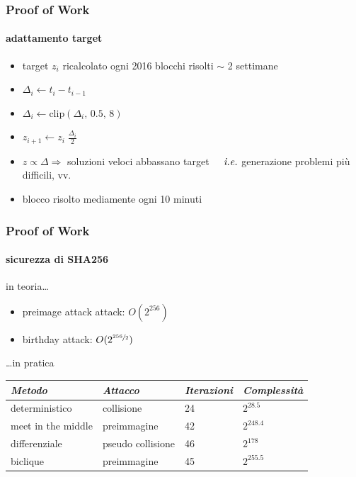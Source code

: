 \begin{frame}
	\frametitle{Proof of Work}
	\framesubtitle{adattamento target}
	
	\begin{itemize}
		\item target $z_i$ ricalcolato ogni 2016 blocchi risolti $\sim$ 2 settimane
		\item $\Delta_i \leftarrow t_{i} - t_{i-1}$
		\item $\Delta_i \leftarrow \mathrm{clip}(\Delta_i,\,0.5,\,8)$
		\item $z_{i+1} \leftarrow z_i\;\frac{\Delta_i}{2}$
		\item $z \propto \Delta \Rightarrow$ {\color{blue}soluzioni veloci} abbassano target 
			\newline $\;\;\;\;\text{\textit{i.e.}}$ generazione {\color{blue}problemi più difficili}, vv.
		\item blocco risolto mediamente ogni 10 minuti
	\end{itemize}
\end{frame}
\begin{frame}
	\frametitle{Proof of Work}
	\framesubtitle{sicurezza di SHA256}
	
	in teoria\ldots
	\begin{itemize}
		\item {\color{blue}preimage attack} attack: $O(2^{256})$
		\item {\color{blue}birthday attack}: $O(2^{\sfrac{256}{2}})$
	\end{itemize}
	
	\ldots in pratica
	
	\begin{table}
	    \begin{tabular}{l|l|l|l}
		    \textit{Metodo}             & \textit{Attacco}           & \textit{Iterazioni} & \textit{Complessità} \\ \hline
		    deterministico     & collisione        & 24         & $2^{28.5}$ \\  %
		    meet in the middle & preimmagine       & 42         & $2^{248.4}$ \\ %
		    differenziale      & pseudo collisione & 46         & $2^{178}$ \\
		    biclique           & preimmagine       & 45         & $2^{255.5}$ \\
	    \end{tabular}
	\end{table}
\end{frame}
